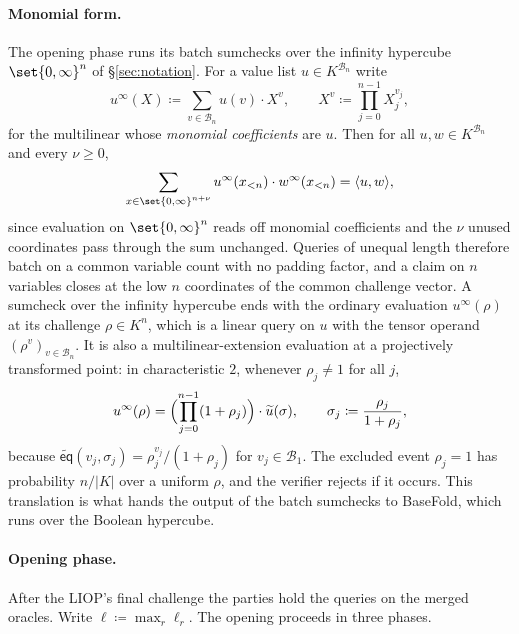 \documentclass{article}
\theoremstyle{definition}
\newcommand*{\mle}{\widetilde}
\newcommand{\eq}{\mathsf{eq}}
\newcommand{\BB}{\mathcal{B}}
\begin{document}
\paragraph{Monomial form.}
The opening phase runs its batch sumchecks over the infinity hypercube $\set{0, \infty}^n$ of \S\ref{sec:notation}. For a value list $u \in K^{\BB_n}$ write
\[
  u^\infty(X) \coloneqq \sum_{v \in \BB_n} u(v) \cdot X^v, \qquad X^v \coloneqq \prod_{j = 0}^{n - 1} X_j^{v_j},
\]
for the multilinear whose \emph{monomial coefficients} are $u$. Then for all $u, w \in K^{\BB_n}$ and every $\nu \ge 0$,
\begin{equation}
  \sum_{x \in \set{0, \infty}^{n + \nu}} u^\infty(x_{< n}) \cdot w^\infty(x_{< n}) = \langle u, w \rangle,
  \label{eq:infty-inner-product}
\end{equation}
since evaluation on $\set{0, \infty}^n$ reads off monomial coefficients and the $\nu$ unused coordinates pass through the sum unchanged. Queries of unequal length therefore batch on a common variable count with no padding factor, and a claim on $n$ variables closes at the low $n$ coordinates of the common challenge vector. A sumcheck over the infinity hypercube ends with the ordinary evaluation $u^\infty(\rho)$ at its challenge $\rho \in K^n$, which is a linear query on $u$ with the tensor operand $(\rho^v)_{v \in \BB_n}$. It is also a multilinear-extension evaluation at a projectively transformed point: in characteristic $2$, whenever $\rho_j \ne 1$ for all $j$,
\begin{equation}
  u^\infty(\rho) = \Bigl( \prod_{j = 0}^{n - 1} (1 + \rho_j) \Bigr) \cdot \mle{u}(\sigma), \qquad \sigma_j \coloneqq \frac{\rho_j}{1 + \rho_j},
  \label{eq:monomial-to-mle}
\end{equation}
because $\mle{\eq}(v_j, \sigma_j) = \rho_j^{v_j} / (1 + \rho_j)$ for $v_j \in \BB_1$. The excluded event $\rho_j = 1$ has probability $n / |K|$ over a uniform $\rho$, and the verifier rejects if it occurs. This translation is what hands the output of the batch sumchecks to BaseFold, which runs over the Boolean hypercube.

\paragraph{Opening phase.}
After the LIOP's final challenge the parties hold the queries on the merged oracles. Write $\boldsymbol{\ell} \coloneqq \max_r \ell_r$. The opening proceeds in three phases.
\end{document}
